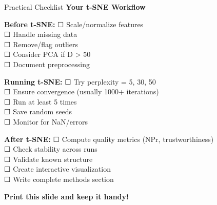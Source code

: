 \documentclass[10pt]{beamer}
\newcommand{\emphtext}[1]{\textcolor{upcblue}{\textbf{#1}}}
\newcommand{\warningbox}[1]{\colorbox{red!10}{\begin{minipage}{0.85\textwidth}\centering #1\end{minipage}}}
\begin{document}
\begin{frame}{Practical Checklist}
\emphtext{Your t-SNE Workflow}

\vspace{0.3cm}
\textbf{Before t-SNE:}
\footnotesize
☐ Scale/normalize features\\
☐ Handle missing data\\
☐ Remove/flag outliers\\
☐ Consider PCA if D > 50\\
☐ Document preprocessing

\vspace{0.2cm}
\textbf{Running t-SNE:}
\footnotesize
☐ Try perplexity = {5, 30, 50}\\
☐ Ensure convergence (usually 1000+ iterations)\\
☐ Run at least 5 times\\
☐ Save random seeds\\
☐ Monitor for NaN/errors

\vspace{0.2cm}
\textbf{After t-SNE:}
\footnotesize
☐ Compute quality metrics (NPr, trustworthiness)\\
☐ Check stability across runs\\
☐ Validate known structure\\
☐ Create interactive visualization\\
☐ Write complete methods section

\begin{center}
\warningbox{\footnotesize\textbf{Print this slide and keep it handy!}}
\end{center}
\end{frame}
\end{document}
